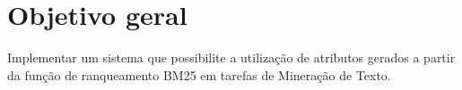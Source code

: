     
    
    
    

    






    \section{Objetivo geral} \label{sec:Objetivo-geral}
        Implementar um sistema que possibilite a utilização de atributos gerados a partir da função de ranqueamento BM25 em tarefas de Mineração de Texto.

